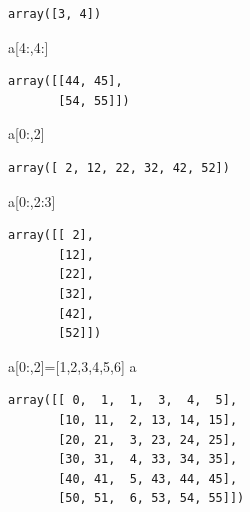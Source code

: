 \documentclass[
  letterpaper,
  DIV=11,
  numbers=noendperiod]{scrreprt}
\newenvironment{Shaded}{\begin{snugshade}}{\end{snugshade}}
\newcommand{\DecValTok}[1]{\textcolor[rgb]{0.68,0.00,0.00}{#1}}
\newcommand{\NormalTok}[1]{\textcolor[rgb]{0.00,0.23,0.31}{#1}}
\newcommand{\OperatorTok}[1]{\textcolor[rgb]{0.37,0.37,0.37}{#1}}
\begin{document}
\begin{verbatim}
array([3, 4])
\end{verbatim}

\begin{Shaded}
\begin{Highlighting}[]
\NormalTok{a[}\DecValTok{4}\NormalTok{:,}\DecValTok{4}\NormalTok{:]}
\end{Highlighting}
\end{Shaded}

\begin{verbatim}
array([[44, 45],
       [54, 55]])
\end{verbatim}

\begin{Shaded}
\begin{Highlighting}[]
\NormalTok{a[}\DecValTok{0}\NormalTok{:,}\DecValTok{2}\NormalTok{]}
\end{Highlighting}
\end{Shaded}

\begin{verbatim}
array([ 2, 12, 22, 32, 42, 52])
\end{verbatim}

\begin{Shaded}
\begin{Highlighting}[]
\NormalTok{a[}\DecValTok{0}\NormalTok{:,}\DecValTok{2}\NormalTok{:}\DecValTok{3}\NormalTok{]}
\end{Highlighting}
\end{Shaded}

\begin{verbatim}
array([[ 2],
       [12],
       [22],
       [32],
       [42],
       [52]])
\end{verbatim}

\begin{Shaded}
\begin{Highlighting}[]
\NormalTok{a[}\DecValTok{0}\NormalTok{:,}\DecValTok{2}\NormalTok{]}\OperatorTok{=}\NormalTok{[}\DecValTok{1}\NormalTok{,}\DecValTok{2}\NormalTok{,}\DecValTok{3}\NormalTok{,}\DecValTok{4}\NormalTok{,}\DecValTok{5}\NormalTok{,}\DecValTok{6}\NormalTok{]}
\NormalTok{a}
\end{Highlighting}
\end{Shaded}

\begin{verbatim}
array([[ 0,  1,  1,  3,  4,  5],
       [10, 11,  2, 13, 14, 15],
       [20, 21,  3, 23, 24, 25],
       [30, 31,  4, 33, 34, 35],
       [40, 41,  5, 43, 44, 45],
       [50, 51,  6, 53, 54, 55]])
\end{verbatim}
\end{document}
